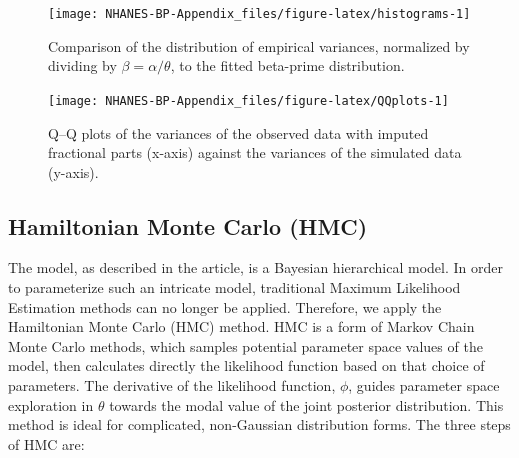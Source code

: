 \documentclass[
]{article}
\begin{document}
\begin{landscape}
\begin{figure}

{\centering \texttt{[image: NHANES-BP-Appendix\_files/figure-latex/histograms-1]} 

}

\caption{Comparison of the distribution of empirical variances, normalized by dividing by $\beta=\alpha/\theta$, to the fitted beta-prime distribution.}\label{fig:histograms}
\end{figure}

\end{landscape}

\begin{figure}

{\centering \texttt{[image: NHANES-BP-Appendix\_files/figure-latex/QQplots-1]} 

}

\caption{Q--Q plots of the variances of the observed data with imputed fractional parts (x-axis) against the variances of the simulated data (y-axis).}\label{fig:QQplots}
\end{figure}

\hypertarget{hamiltonian-monte-carlo-hmc}{%
\subsection{Hamiltonian Monte Carlo (HMC)}\label{hamiltonian-monte-carlo-hmc}}

The model, as described in the article, is a Bayesian hierarchical model. In order to parameterize such an intricate model, traditional Maximum Likelihood Estimation methods can no longer be applied. Therefore, we apply the Hamiltonian Monte Carlo (HMC) method. HMC is a form of Markov Chain Monte Carlo methods, which samples potential parameter space values of the model, then calculates directly the likelihood function based on that choice of parameters. The derivative of the likelihood function, \(\phi\), guides parameter space exploration in \(\theta\) towards the modal value of the joint posterior distribution. This method is ideal for complicated, non-Gaussian distribution forms. The three steps of HMC are:
\end{document}
